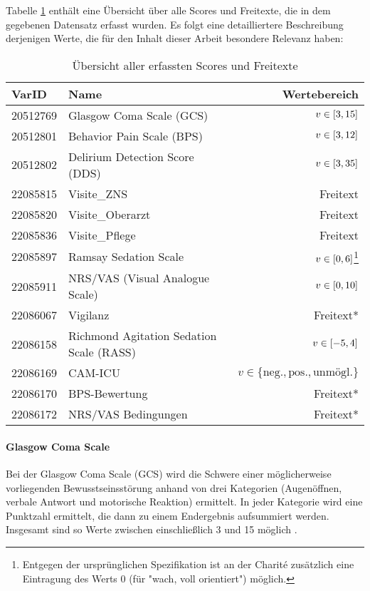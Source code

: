 Tabelle \ref{table:varids} enthält eine Übersicht über alle Scores und Freitexte, die in dem gegebenen Datensatz erfasst wurden. Es folgt eine detailliertere Beschreibung derjenigen Werte, die für den Inhalt dieser Arbeit besondere Relevanz haben:

\begin{table}[htb] %
    \centering
    \begin{tabular}{llr}\toprule
        \textbf{VarID}	&\textbf{Name} &\textbf{Wertebereich} \\\midrule
        20512769    & Glasgow Coma Scale (GCS)          & $v \in \interval{3}{15}$ \\
        20512801    & Behavior Pain Scale (BPS)         & $v \in \interval{3}{12}$ \\
        20512802    & Delirium Detection Score (DDS)    & $v \in \interval{3}{35}$ \\
        22085815    & Visite\_ZNS                        & Freitext \\
        22085820    & Visite\_Oberarzt                   & Freitext \\
        22085836    & Visite\_Pflege                     & Freitext \\
        22085897    & Ramsay Sedation Scale             & $v \in \interval{0}{6}$\footnote{Entgegen der ursprünglichen Spezifikation ist an der Charité zusätzlich eine Eintragung des Werts $0$ (für "wach, voll orientiert") möglich.} \\
        22085911    & NRS/VAS (Visual Analogue Scale)   & $v \in \interval{0}{10}$ \\
        22086067    & Vigilanz                          & Freitext* \\
        22086158    & Richmond Agitation Sedation Scale (RASS) & $v \in \interval{-5}{4}$ \\
        22086169    & CAM-ICU                           & $v \in \{	\text{neg.}, \text{pos.}, \text{unmögl.} \}$ \\
        22086170    & BPS-Bewertung                     & Freitext* \\
        22086172    & NRS/VAS Bedingungen               & Freitext* \\\bottomrule
    \end{tabular}

    \caption{Übersicht aller erfassten Scores und Freitexte}
    \label{table:varids}
\end{table}

\paragraph{Glasgow Coma Scale}
Bei der Glasgow Coma Scale (GCS) wird die Schwere einer möglicherweise vorliegenden Bewusstseinsstörung anhand von drei Kategorien (Augenöffnen, verbale Antwort und motorische Reaktion) ermittelt. In jeder Kategorie wird eine Punktzahl ermittelt, die dann zu einem Endergebnis aufsummiert werden. Insgesamt sind so Werte zwischen einschließlich 3 und 15 möglich \citep{teasdaleAssessmentComaImpaired1974,marxIntensivmedizin2015c}.

